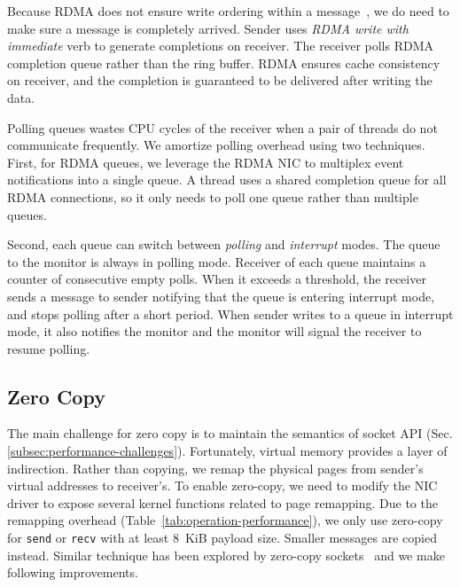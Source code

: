 Because RDMA does not ensure write ordering within a message~\cite{infiniband2000infiniband}, we do need to make sure a message is completely arrived. Sender uses \textit{RDMA write with immediate} verb to generate completions on receiver. The receiver polls RDMA completion queue rather than the ring buffer. RDMA ensures cache consistency on receiver, and the completion is guaranteed to be delivered after writing the data.


Polling queues wastes CPU cycles of the receiver when a pair of threads do not communicate frequently. We amortize polling overhead using two techniques.
First, for RDMA queues, we leverage the RDMA NIC to multiplex event notifications into a single queue.
A thread uses a shared completion queue for all RDMA connections, so it only needs to poll one queue rather than multiple queues.

Second, each queue can switch between \textit{polling} and \textit{interrupt} modes. The queue to the monitor is always in polling mode. Receiver of each queue maintains a counter of consecutive empty polls. When it exceeds a threshold, the receiver sends a message to sender notifying that the queue is entering interrupt mode, and stops polling after a short period. When sender writes to a queue in interrupt mode, it also notifies the monitor and the monitor will signal the receiver to resume polling.


\subsection{Zero Copy}
\label{subsec:zerocopy}


The main challenge for zero copy is to maintain the semantics of socket API (Sec.\ref{subsec:performance-challenges}).
Fortunately, virtual memory provides a layer of indirection. %
Rather than copying, we remap the physical pages from sender's virtual addresses to receiver's.
To enable zero-copy, we need to modify the NIC driver to expose several kernel functions related to page remapping. 
Due to the remapping overhead (Table~\ref{tab:operation-performance}), we only use zero-copy for \texttt{send} or \texttt{recv} with at least 8~KiB payload size. Smaller messages are copied instead.
Similar technique has been explored by zero-copy sockets~\cite{thadani1995efficient,chu1996zero,linux-zero-copy} and we make following improvements.

